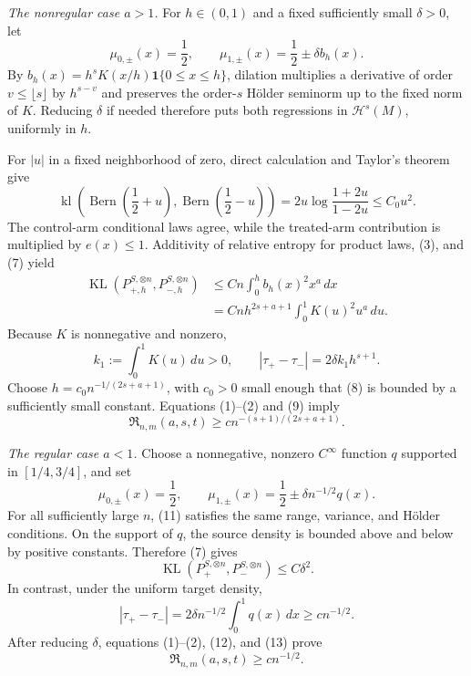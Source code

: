 \emph{The nonregular case \(a>1\).}
For \(h\in(0,1)\) and a fixed sufficiently small \(\delta>0\), let
\[
 \mu_{0,\pm}(x)=\frac12,
 \qquad
 \mu_{1,\pm}(x)=\frac12\pm\delta b_h(x).
\tag{6}
\]
By \(b_h(x)=h^sK(x/h)\mathbf 1\{0\le x\le h\}\), dilation multiplies a derivative of order \(v\le\lfloor s\rfloor\) by \(h^{s-v}\) and preserves the order-\(s\) Hölder seminorm up to the fixed norm of \(K\). Reducing \(\delta\) if needed therefore puts both regressions in \(\mathcal H^s(M)\), uniformly in \(h\).

For \(|u|\) in a fixed neighborhood of zero, direct calculation and Taylor's theorem give
\[
 \operatorname{kl}\!\left(
  \operatorname{Bern}\left(\frac12+u\right),
  \operatorname{Bern}\left(\frac12-u\right)
 \right)
 =2u\log\frac{1+2u}{1-2u}
 \le C_0u^2.
\tag{7}
\]
The control-arm conditional laws agree, while the treated-arm contribution is multiplied by \(e(x)\le1\). Additivity of relative entropy for product laws, (3), and (7) yield
\[
 \begin{aligned}
 \operatorname{KL}(P_{+,h}^{S,\otimes n},P_{-,h}^{S,\otimes n})
 &\le Cn\int_0^h b_h(x)^2x^a\,dx\\
 &=Cnh^{2s+a+1}\int_0^1K(u)^2u^a\,du.
 \end{aligned}
\tag{8}
\]
Because \(K\) is nonnegative and nonzero,
\[
 k_1:=\int_0^1K(u)\,du>0,
 \qquad
 |\tau_+-\tau_-|=2\delta k_1h^{s+1}.
\tag{9}
\]
Choose \(h=c_0n^{-1/(2s+a+1)}\), with \(c_0>0\) small enough that (8) is bounded by a sufficiently small constant. Equations (1)--(2) and (9) imply
\[
 \mathfrak R_{n,m}(a,s,t)
 \ge c n^{-(s+1)/(2s+a+1)}.
\tag{10}
\]

\emph{The regular case \(a<1\).}
Choose a nonnegative, nonzero \(C^\infty\) function \(q\) supported in \([1/4,3/4]\), and set
\[
 \mu_{0,\pm}(x)=\frac12,
 \qquad
 \mu_{1,\pm}(x)=\frac12\pm\delta n^{-1/2}q(x).
\tag{11}
\]
For all sufficiently large \(n\), (11) satisfies the same range, variance, and Hölder conditions. On the support of \(q\), the source density is bounded above and below by positive constants. Therefore (7) gives
\[
 \operatorname{KL}(P_+^{S,\otimes n},P_-^{S,\otimes n})
 \le C\delta^2.
\tag{12}
\]
In contrast, under the uniform target density,
\[
 |\tau_+-\tau_-|
 =2\delta n^{-1/2}\int_0^1q(x)\,dx
 \ge c n^{-1/2}.
\tag{13}
\]
After reducing \(\delta\), equations (1)--(2), (12), and (13) prove
\[
 \mathfrak R_{n,m}(a,s,t)\ge c n^{-1/2}.
\tag{14}
\]

